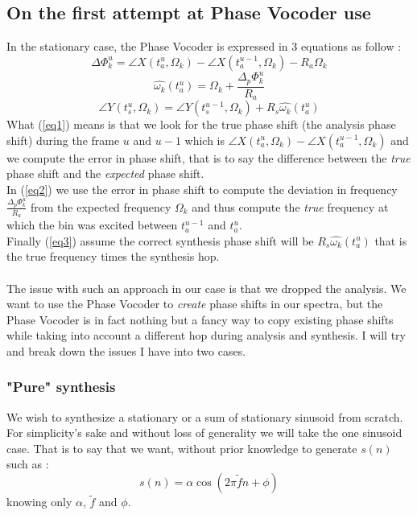 \documentclass[]{article}
\begin{document}
\subsection{On the first attempt at Phase Vocoder use}
In the stationary case, the Phase Vocoder is expressed in 3 equations as follow :
\begin{equation}\label{eq1}
\Delta \Phi_{k}^{u} = \angle X(t_a^u, \Omega_k) - \angle X(t_a^{u-1}, \Omega_k) - R_a \Omega_k
\end{equation}
\begin{equation}\label{eq2}
\hat{\omega_k}(t_a^u) = \Omega_k + \frac{\Delta_p \Phi_{k}^u}{R_a}
\end{equation}
\begin{equation}\label{eq3}
\angle Y(t_s^u, \Omega_k) = \angle Y(t_s^{u-1}, \Omega_k) + R_s \hat{\omega_k}(t_a^u)
\end{equation}
What (\ref{eq1}) means is that we look for the true phase shift (the analysis phase shift) during the frame $u$ and $u-1$ which is $\angle X(t_a^u, \Omega_k) - \angle X(t_a^{u-1}, \Omega_k)$ and we compute the error in phase shift, that is to say the difference between the \emph{true} phase shift and the \emph{expected} phase shift.\\
In (\ref{eq2}) we use the error in phase shift to compute the deviation in frequency $\frac{\Delta_p \Phi_{k}^u}{R_a}$ from the expected frequency $\Omega_k$ and thus compute the \emph{true} frequency at which the bin was excited between $t_a^{u-1}$ and $t_a^{u}$.\\
Finally (\ref{eq3}) assume the correct synthesis phase shift will be $R_s\hat{\omega_k}(t_a^u)$ that is the true frequency times the synthesis hop.\\
\\
The issue with such an approach in our case is that we dropped the analysis. We want to use the Phase Vocoder to \emph{create} phase shifts in our spectra, but the Phase Vocoder is in fact nothing but a fancy way to copy existing phase shifts while taking into account a different hop during analysis and synthesis. I will try and break down the issues I have into two cases.
\subsubsection{"Pure" synthesis}\label{puresynth}
We wish to synthesize a stationary or a sum of stationary sinusoid from scratch. For simplicity's sake and without loss of generality we will take the one sinusoid case.
That is to say that we want, without prior knowledge to generate $s(n)$ such as :
\begin{equation}\label{statSignal}
s(n) = \alpha \cos(2\pi\tilde{f} n + \phi)
\end{equation}
knowing only $\alpha$, $\tilde{f}$ and $\phi$.\\
\end{document}
